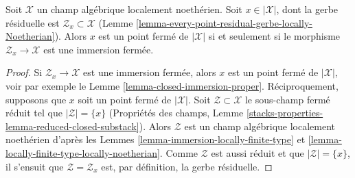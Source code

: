 \begin{lemma}
\label{lemma-residual-space-closed}
Soit $\mathcal{X}$ un champ alg\'ebrique localement noeth\'erien.
Soit $x \in |\mathcal{X}|$, dont la gerbe r\'esiduelle est
$\mathcal{Z}_x \subset \mathcal{X}$
(Lemme \ref{lemma-every-point-residual-gerbe-locally-Noetherian}).
Alors $x$ est un point ferm\'e de $|\mathcal{X}|$ si et seulement si
le morphisme $\mathcal{Z}_x \to \mathcal{X}$ est une immersion ferm\'ee.
\end{lemma}

\begin{proof}
Si $\mathcal{Z}_x \to \mathcal{X}$ est une immersion ferm\'ee, alors
$x$ est un point ferm\'e de $|\mathcal{X}|$, voir par exemple le
Lemme \ref{lemma-closed-immersion-proper}.
R\'eciproquement, supposons que $x$ soit un point ferm\'e de $|\mathcal{X}|$.
Soit $\mathcal{Z} \subset \mathcal{X}$
le sous-champ ferm\'e r\'eduit tel que $|\mathcal{Z}| = \{x\}$
(Propri\'et\'es des champs,
Lemme \ref{stacks-properties-lemma-reduced-closed-substack}).
Alors $\mathcal{Z}$ est un champ alg\'ebrique localement noeth\'erien
d'apr\`es les Lemmes \ref{lemma-immersion-locally-finite-type} et
\ref{lemma-locally-finite-type-locally-noetherian}.
Comme $\mathcal{Z}$ est aussi r\'eduit et que $|\mathcal{Z}| = \{x\}$,
il s'ensuit que $\mathcal{Z} = \mathcal{Z}_x$ est, par d\'efinition, la
gerbe r\'esiduelle.
\end{proof}

















